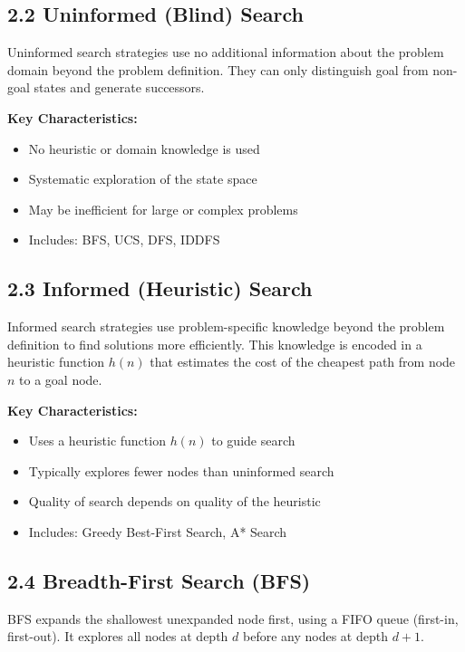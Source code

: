 \documentclass[12pt,a4paper]{article}
\begin{document}
\subsection*{2.2 Uninformed (Blind) Search}

Uninformed search strategies use no additional information about the problem domain beyond the problem definition. They can only distinguish goal from non-goal states and generate successors.

\textbf{Key Characteristics:}
\begin{itemize}[leftmargin=1.4em]
  \item No heuristic or domain knowledge is used
  \item Systematic exploration of the state space
  \item May be inefficient for large or complex problems
  \item Includes: BFS, UCS, DFS, IDDFS
\end{itemize}

\subsection*{2.3 Informed (Heuristic) Search}

Informed search strategies use problem-specific knowledge beyond the problem definition to find solutions more efficiently. This knowledge is encoded in a heuristic function $h(n)$ that estimates the cost of the cheapest path from node $n$ to a goal node.

\textbf{Key Characteristics:}
\begin{itemize}[leftmargin=1.4em]
  \item Uses a heuristic function $h(n)$ to guide search
  \item Typically explores fewer nodes than uninformed search
  \item Quality of search depends on quality of the heuristic
  \item Includes: Greedy Best-First Search, A* Search
\end{itemize}

\subsection*{2.4 Breadth-First Search (BFS)}

BFS expands the shallowest unexpanded node first, using a FIFO queue (first-in, first-out). It explores all nodes at depth $d$ before any nodes at depth $d+1$.
\end{document}
